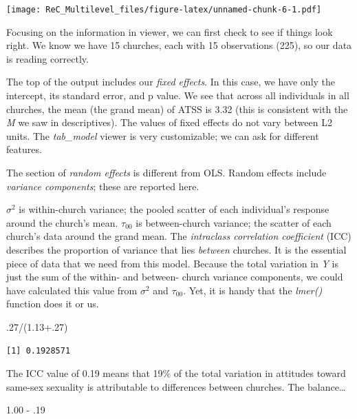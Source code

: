 \documentclass[
  english,
]{book}
\newenvironment{Shaded}{\begin{snugshade}}{\end{snugshade}}
\newcommand{\DecValTok}[1]{\textcolor[rgb]{0.00,0.00,0.81}{#1}}
\newcommand{\FloatTok}[1]{\textcolor[rgb]{0.00,0.00,0.81}{#1}}
\newcommand{\NormalTok}[1]{#1}
\newcommand{\SpecialCharTok}[1]{\textcolor[rgb]{0.00,0.00,0.00}{#1}}
\begin{document}
\texttt{[image: ReC\_Multilevel\_files/figure-latex/unnamed-chunk-6-1.pdf]}

Focusing on the information in viewer, we can first check to see if things look right. We know we have 15 churches, each with 15 observations (225), so our data is reading correctly.

The top of the output includes our \emph{fixed effects}. In this case, we have only the intercept, its standard error, and p value. We see that across all individuals in all churches, the mean (the grand mean) of ATSS is 3.32 (this is consistent with the \emph{M} we saw in descriptives). The values of fixed effects do not vary between L2 units. The \emph{tab\_model} viewer is very customizable; we can ask for different features.

The section of \emph{random effects} is different from OLS. Random effects include \emph{variance components}; these are reported here.

\(\sigma^{2}\) is within-church variance; the pooled scatter of each individual's response around the church's mean.
\(\tau _{00}\) is between-church variance; the scatter of each church's data around the grand mean.
The \emph{intraclass correlation coefficient} (ICC) describes the proportion of variance that lies \emph{between} churches. It is the essential piece of data that we need from this model. Because the total variation in \emph{Y} is just the sum of the within- and between- church variance components, we could have calculated this value from \(\sigma^{2}\) and \(\tau _{00}\). Yet, it is handy that the \emph{lmer()} function does it or us.

\begin{Shaded}
\begin{Highlighting}[]
\NormalTok{.}\DecValTok{27}\SpecialCharTok{/}\NormalTok{(}\FloatTok{1.13+.27}\NormalTok{)}
\end{Highlighting}
\end{Shaded}

\begin{verbatim}
[1] 0.1928571
\end{verbatim}

The ICC value of 0.19 means that 19\% of the total variation in attitudes toward same-sex sexuality is attributable to differences between churches. The balance\ldots{}

\begin{Shaded}
\begin{Highlighting}[]
\FloatTok{1.00} \SpecialCharTok{{-}}\NormalTok{ .}\DecValTok{19}
\end{Highlighting}
\end{Shaded}
\end{document}
